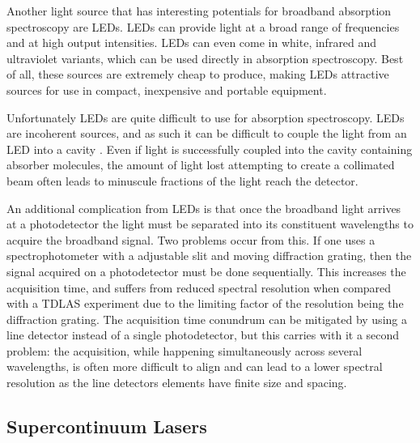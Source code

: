 Another light source that has interesting potentials for broadband absorption
spectroscopy are \acp{LED}. \acp{LED} can provide light at a broad range of
frequencies and at high output intensities. \acp{LED} can even come in white,
infrared and ultraviolet variants, which can be used directly in absorption
spectroscopy. Best of all, these sources are extremely cheap to produce, making
\acp{LED} attractive sources for use in compact, inexpensive and portable
equipment.

Unfortunately \acp{LED} are quite difficult to use for absorption
spectroscopy.  \acp{LED} are incoherent sources, and as such it can be
difficult to couple the light from an \ac{LED} into a
cavity \cite{Seetohul:2009du,Islam:2007ea}. Even if light is successfully
coupled into the cavity containing absorber molecules, the amount of light
lost attempting to create a collimated beam often leads to minuscule fractions
of the light reach the detector.



An additional complication from \acp{LED} is that once the broadband light
arrives at a photodetector the light must be separated into its constituent
wavelengths to acquire the broadband signal. Two problems occur from
this. If one uses a spectrophotometer with a adjustable slit and moving
diffraction grating, then the signal acquired on a photodetector must be
done sequentially. This increases the acquisition time, and suffers from
reduced spectral resolution when compared with a \ac{TDLAS} experiment due
to the limiting factor of the resolution being the diffraction grating. The
acquisition time conundrum can be mitigated by using a line detector instead
of a single photodetector, but this carries with it a second problem: the
acquisition, while happening simultaneously across several wavelengths, is
often more difficult to align and can lead to a lower spectral resolution as
the line detectors elements have finite size and spacing.



\subsection{Supercontinuum Lasers}\label{subsec:super}

